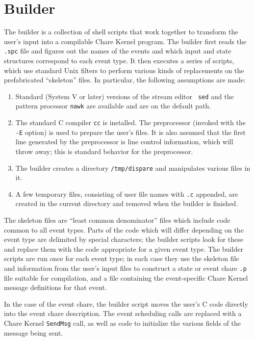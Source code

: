 \section{Builder}

The builder is a collection of shell scripts that work together to
transform the user's input into a compilable Chare Kernel program.  The
builder first reads the {\tt .spc} file and figures out the names of the
events and which input and state structures correspond to each event
type.  It then executes a series of scripts, which use standard Unix
filters to perform various kinds of
replacements on the prefabricated ``skeleton'' files.  In particular,
the following assumptions are made:

\begin{enumerate}
\item Standard (System V or later) versions of the stream editor {\tt
sed} and the pattern processor {\tt nawk} are available and are on the
default path.

\item The standard C compiler {\tt cc} is installed.  The preprocessor
(invoked with the {\tt -E} option) is used to prepare the user's files.
It is also assumed that the first line generated by the preprocessor is
line control information, which \dispare will throw away; this is
standard behavior for the preprocessor.

\item The builder creates a directory {\tt /tmp/dispare} and
manipulates various files in it.

\item A few temporary files, consisting of user file names with {\tt .c}
appended, are created in the current directory and removed when the
builder is finished.
\end{enumerate}

The skeleton files are ``least common denominator'' files which include
code common to all event types.  Parts of the code which will differ
depending on the event type are delimited by special characters; the
builder scripts look for these and replace them with the code
appropriate for a given event type.  The builder scripts are run once
for each event type; in each case they use the skeleton file and
information from the user's input files to construct a state or event
chare {\tt .p} file suitable for compilation, and a file containing the
event-specific Chare Kernel message definitions for that event.  

In the case of the event chare, the builder script moves the user's C
code directly into the event chare description.  The event scheduling
calls are replaced with a Chare Kernel {\tt SendMsg} call, as well as
code to initialize the various fields of the message being sent.

